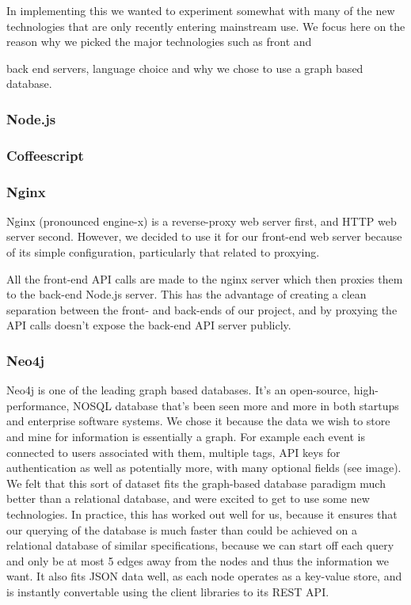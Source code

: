 \documentclass[11pt]{article}
\begin{document}
In implementing this we wanted to experiment somewhat with many of the new technologies that are only recently entering mainstream use. We focus here on the reason why we picked the major technologies such as front and {back end servers, language choice and why we chose to use a graph based database.

\subsubsection {Node.js}
\subsubsection {Coffeescript}
\subsubsection {Nginx}
Nginx (pronounced engine-x) is a reverse-proxy web server first, and HTTP web server second. However, we decided to use it for our front-end web server because of its simple configuration, particularly that related to proxying. 

All the front-end API calls are made to the nginx server which then proxies them to the back-end Node.js server. This has the advantage of creating a clean separation between the front- and back-ends of our project, and by proxying the API calls doesn't expose the back-end API server publicly. 
\subsubsection {Neo4j}

Neo4j is one of the leading graph based databases. It's an open-source, high-performance, NOSQL database that's been seen more and more in both startups and enterprise software systems. We chose it because the data we wish to store and mine for information is essentially a graph. For example each event is connected to users associated with them, multiple tags, API keys for authentication as well as potentially more, with many optional fields (see image). We felt that this sort of dataset fits the graph-based database paradigm much better than a relational database, and were excited to get to use some new technologies. In practice, this has worked out well for us, because it ensures that our querying of the database is much faster than could be achieved on a relational database of similar specifications, because we can start off each query and only be at most 5 edges away from the nodes and thus the information we want. It also fits JSON data well, as each node operates as a key-value store, and is instantly convertable using the client libraries to its REST API.

}
\end{document}

